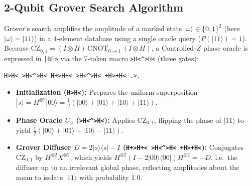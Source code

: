 \documentclass[11pt,a4paper,twocolumn]{article}
\newcommand{\bra}[1]{\langle #1 |}
\newcommand{\ket}[1]{| #1 \rangle}
\newcommand{\ketbra}[2]{| #1 \rangle\langle #2 |}
\begin{document}
\subsection{2-Qubit Grover Search Algorithm}
Grover's search \cite{grover1996fast} amplifies the amplitude of a marked state $\ket{\omega} \in \{0,1\}^2$ (here $\ket{\omega} = \ket{11}$) in a 4-element database using a single oracle query ($P(\ket{11}) = 1$). Because $\text{CZ}_{0,1} = (I \otimes H) \, \text{CNOT}_{0\to 1} \, (I \otimes H)$, a Controlled-$Z$ phase oracle is expressed in \texttt{|BF>} via the 7-token macro \texttt{>H<\^{}>H<} (three gates):

\begin{lstlisting}[caption={Complete 2-Qubit Grover search for $\ket{\omega} = \ket{11}$ in \texttt{|BF>}.}]
H>H< >H<^>H< H+>H+< >H<^>H< +H>+H< .>.
\end{lstlisting}

\begin{itemize}
    \item \textbf{Initialization (\texttt{H>H<}):} Prepares the uniform superposition $\ket{s} = H^{\otimes 2}\ket{00} = \frac{1}{2}(\ket{00} + \ket{01} + \ket{10} + \ket{11})$.
    \item \textbf{Phase Oracle $U_\omega$ (\texttt{>H<\^{}>H<}):} Applies $\text{CZ}_{0,1}$, flipping the phase of $\ket{11}$ to yield $\frac{1}{2}(\ket{00} + \ket{01} + \ket{10} - \ket{11})$.
    \item \textbf{Grover Diffuser $D = 2\ket{s}\bra{s} - I$ (\texttt{H+>H+< >H<\^{}>H< +H>+H<}):} Conjugates $\text{CZ}_{0,1}$ by $H^{\otimes 2} X^{\otimes 2}$, which yields $H^{\otimes 2}(I - 2\ketbra{00}{00})H^{\otimes 2} = -D$, i.e.\ the diffuser up to an irrelevant global phase, reflecting amplitudes about the mean to isolate $\ket{11}$ with probability 1.0.
\end{itemize}
\end{document}
